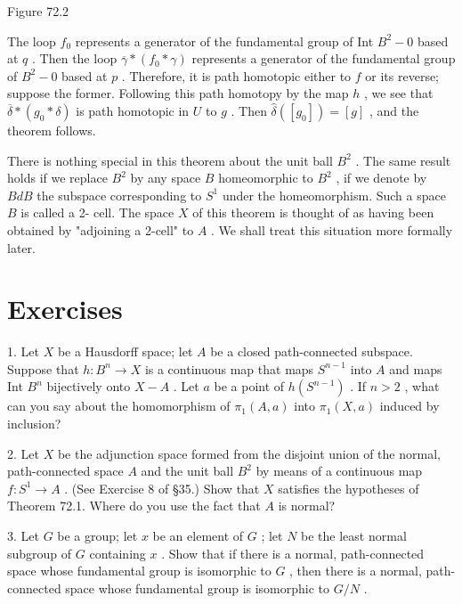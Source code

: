 \documentclass[10pt]{article}
\begin{document}
Figure 72.2

The loop \({f}_{0}\) represents a generator of the fundamental group of Int \({B}^{2} - 0\) based at \(q\) . Then the loop \(\overline{\gamma } * \left( {{f}_{0} * \gamma }\right)\) represents a generator of the fundamental group of \({B}^{2} - 0\) based at \(p\) . Therefore, it is path homotopic either to \(f\) or its reverse; suppose the former. Following this path homotopy by the map \(h\) , we see that \(\overline{\delta } * \left( {{g}_{0} * \delta }\right)\) is path homotopic in \(U\) to \(g\) . Then \(\widehat{\delta }\left( \left\lbrack  {g}_{0}\right\rbrack  \right)  = \left\lbrack  g\right\rbrack\) , and the theorem follows.

There is nothing special in this theorem about the unit ball \({B}^{2}\) . The same result holds if we replace \({B}^{2}\) by any space \(B\) homeomorphic to \({B}^{2}\) , if we denote by \({BdB}\) the subspace corresponding to \({S}^{1}\) under the homeomorphism. Such a space \(B\) is called a 2- cell. The space \(X\) of this theorem is thought of as having been obtained by "adjoining a 2-cell" to \(A\) . We shall treat this situation more formally later.

\section*{Exercises}

1. Let \(X\) be a Hausdorff space; let \(A\) be a closed path-connected subspace. Suppose that \(h : {B}^{n} \rightarrow  X\) is a continuous map that maps \({S}^{n - 1}\) into \(A\) and maps Int \({B}^{n}\) bijectively onto \(X - A\) . Let \(a\) be a point of \(h\left( {S}^{n - 1}\right)\) . If \(n > 2\) , what can you say about the homomorphism of \({\pi }_{1}\left( {A,a}\right)\) into \({\pi }_{1}\left( {X,a}\right)\) induced by inclusion?

2. Let \(X\) be the adjunction space formed from the disjoint union of the normal, path-connected space \(A\) and the unit ball \({B}^{2}\) by means of a continuous map \(f : {S}^{1} \rightarrow  A\) . (See Exercise 8 of §35.) Show that \(X\) satisfies the hypotheses of Theorem 72.1. Where do you use the fact that \(A\) is normal?

3. Let \(G\) be a group; let \(x\) be an element of \(G\) ; let \(N\) be the least normal subgroup of \(G\) containing \(x\) . Show that if there is a normal, path-connected space whose fundamental group is isomorphic to \(G\) , then there is a normal, path-connected space whose fundamental group is isomorphic to \(G/N\) .
\end{document}
